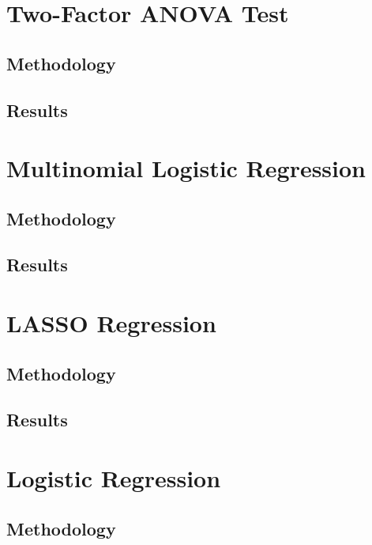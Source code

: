 \documentclass{article}
\begin{document}
\section{Two-Factor ANOVA Test}

\subsection{Methodology}

\subsection{Results}

\newpage

\section{Multinomial Logistic Regression}

\subsection{Methodology}

\subsection{Results}

\newpage

\section{LASSO Regression}

\subsection{Methodology}

\subsection{Results}

\newpage

\section{Logistic Regression}

\subsection{Methodology}
\end{document}
